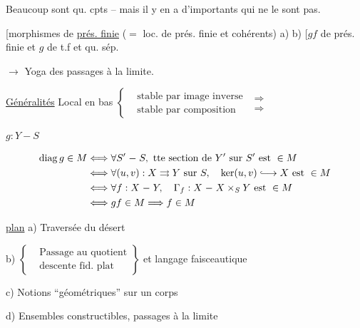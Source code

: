 Beaucoup sont qu. cpts -- mais il y en a d'importants qui ne le sont pas.

[morphismes de \uline{prés. finie} ($={}$ loc. de prés. finie et cohérents) \quad a) b) \quad [$gf$ de prés. finie et $g$ de t.f et qu. sép.


$\longrightarrow$ Yoga des passages à la limite.

\uline{Généralités} \quad Local en bas $\left\{\begin{aligned}&\text{stable par image inverse}\\&\text{stable par composition}\end{aligned}\right.$ $\substack{\Longrightarrow\\\Longrightarrow}$

$g:Y\mathrel{-}S$

\[
\begin{aligned}
\operatorname{diag}g\in M &\Longleftrightarrow \forall S'\mathrel{-}S,\ \text{tte section de }Y'\text{ sur }S'\text{ est }\in M\\
 &\Longleftrightarrow \forall (u,v):X\rightrightarrows Y\text{ sur }S,\quad\ker(u,v)\lhook\joinrel\longrightarrow X\text{ est }\in M\\
 &\Longleftrightarrow \forall f:X\mathrel{-}Y,\quad\Gamma_f:X\mathrel{-}X\times_S Y\text{ est }\in M\\
 &\Longleftrightarrow gf\in M\Longrightarrow f\in M
\end{aligned}
\]



\uline{plan} \quad a) Traversée du désert

b) $\left\{\begin{aligned}&\text{Passage au quotient}\\&\text{descente fid. plat}\end{aligned}\right\}$ et langage faisceautique

c) Notions ``géométriques'' sur un corps

d)  Ensembles constructibles, passages à la limite

